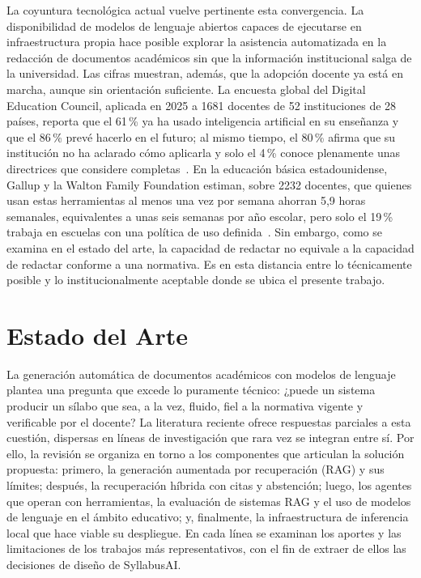 La coyuntura tecnológica actual vuelve pertinente esta convergencia. La disponibilidad de modelos de lenguaje abiertos capaces de ejecutarse en infraestructura propia hace posible explorar la asistencia automatizada en la redacción de documentos académicos sin que la información institucional salga de la universidad. Las cifras muestran, además, que la adopción docente ya está en marcha, aunque sin orientación suficiente. La encuesta global del Digital Education Council, aplicada en 2025 a 1681 docentes de 52 instituciones de 28 países, reporta que el 61\,\% ya ha usado inteligencia artificial en su enseñanza y que el 86\,\% prevé hacerlo en el futuro; al mismo tiempo, el 80\,\% afirma que su institución no ha aclarado cómo aplicarla y solo el 4\,\% conoce plenamente unas directrices que considere completas~\cite{dec2025survey}. En la educación básica estadounidense, Gallup y la Walton Family Foundation estiman, sobre 2232 docentes, que quienes usan estas herramientas al menos una vez por semana ahorran 5,9 horas semanales, equivalentes a unas seis semanas por año escolar, pero solo el 19\,\% trabaja en escuelas con una política de uso definida~\cite{gallup2025teachers}. Sin embargo, como se examina en el estado del arte, la capacidad de redactar no equivale a la capacidad de redactar conforme a una normativa. Es en esta distancia entre lo técnicamente posible y lo institucionalmente aceptable donde se ubica el presente trabajo.

\section{Estado del Arte}
La generación automática de documentos académicos con modelos de lenguaje plantea una pregunta que excede lo puramente técnico: ¿puede un sistema producir un sílabo que sea, a la vez, fluido, fiel a la normativa vigente y verificable por el docente? La literatura reciente ofrece respuestas parciales a esta cuestión, dispersas en líneas de investigación que rara vez se integran entre sí. Por ello, la revisión se organiza en torno a los componentes que articulan la solución propuesta: primero, la generación aumentada por recuperación (RAG) y sus límites; después, la recuperación híbrida con citas y abstención; luego, los agentes que operan con herramientas, la evaluación de sistemas RAG y el uso de modelos de lenguaje en el ámbito educativo; y, finalmente, la infraestructura de inferencia local que hace viable su despliegue. En cada línea se examinan los aportes y las limitaciones de los trabajos más representativos, con el fin de extraer de ellos las decisiones de diseño de SyllabusAI.

